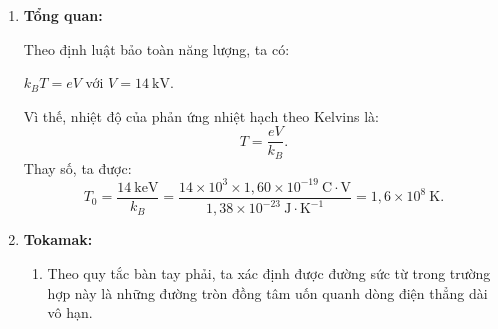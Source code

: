 \begin{loigiai}
\begin{enumerate}
    \item \textbf{Tổng quan:}

Theo định luật bảo toàn năng lượng, ta có:
\begin{center}
    $k_{B}T=eV$ với $V=14~\mathrm{kV}$.
\end{center}
Vì thế, nhiệt độ của phản ứng nhiệt hạch theo Kelvins là: \[T=\dfrac{eV}{k_{B}}.\]
Thay số, ta được: \[T_0=\dfrac{14~\mathrm{keV}}{k_{B}}=\dfrac{14\times10^3\times 1,60\times 10^{-19} ~\mathrm{C\cdot V}}{1,38\times 10^{-23}~\mathrm{J\cdot K^{-1}}}=1,6\times 10^8 ~\mathrm{K}.\]

    \item \textbf{Tokamak:}
\begin{enumerate}[1)]
\item Theo quy tắc bàn tay phải, ta xác định được đường sức từ trong trường hợp này là những đường tròn đồng tâm uốn quanh dòng điện thẳng dài vô hạn.
\begin{center}



\begin{tikzpicture}[x=0.75pt,y=0.75pt,yscale=-1,xscale=1]


\end{tikzpicture}
\end{center}
\end{enumerate}
\end{enumerate}
\end{loigiai}
